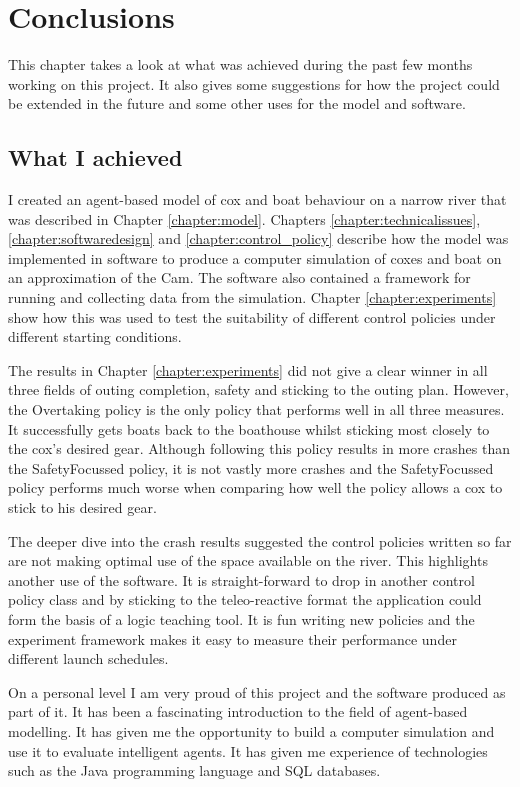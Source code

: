 \chapter{Conclusions}\label{chapter:conclusions}
  This chapter takes a look at what was achieved during the past few months working on this project. It also gives some suggestions for how the project could be extended in the future and some other uses for the model and software.
  
  \section{What I achieved}
  I created an agent-based model of cox and boat behaviour on a narrow river that was described in Chapter \ref{chapter:model}. Chapters \ref{chapter:technicalissues}, \ref{chapter:softwaredesign} and \ref{chapter:control_policy} describe how the model was implemented in software to produce a computer simulation of coxes and boat on an approximation of the Cam. The software also contained a framework for running and collecting data from the simulation. Chapter \ref{chapter:experiments} show how this was used to test the suitability of different control policies under different starting conditions.
  
  The results in Chapter \ref{chapter:experiments} did not give a clear winner in all three fields of outing completion, safety and sticking to the outing plan. However, the Overtaking policy is the only policy that performs well in all three measures. It successfully gets boats back to the boathouse whilst sticking most closely to the cox's desired gear. Although following this policy results in more crashes than the SafetyFocussed policy, it is not vastly more crashes and the SafetyFocussed policy performs much worse when comparing how well the policy allows a cox to stick to his desired gear.
  
  The deeper dive into the crash results suggested the control policies written so far are not making optimal use of the space available on the river. This highlights another use of the software. It is straight-forward to drop in another control policy class and by sticking to the teleo-reactive format the application could form the basis of a logic teaching tool. It is fun writing new policies and the experiment framework makes it easy to measure their performance under different launch schedules.
  
  On a personal level I am very proud of this project and the software produced as part of it. It has been a fascinating introduction to the field of agent-based modelling. It has given me the opportunity to build a computer simulation and use it to evaluate intelligent agents. It has given me experience of technologies such as the Java programming language and SQL databases.
  
